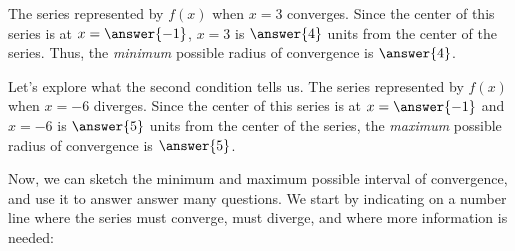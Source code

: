 \documentclass{ximera}
\begin{document}
\begin{exercise}
\begin{hint}
\begin{question}
\begin{question}
The series represented by $f(x)$ when $x=3$ converges.  Since the center of this series is at $x=\answer{-1}$, $x=3$ is $\answer{4}$ units from the center of the series.  Thus, the \emph{minimum} possible radius of convergence is $\answer{4}$.
\end{question}
\end{question}


\begin{question}
Let's explore what the second condition tells us.  The series represented by $f(x)$ when $x=-6$ diverges.  Since the center of this series is at $x=\answer{-1}$ and $x=-6$ is $\answer{5}$ units from the center of the series, the \emph{maximum} possible radius of convergence is $\answer{5}$.
\end{question}

\begin{question}
Now, we can sketch the minimum and maximum possible interval of convergence, and use it to answer answer many questions.  We start by indicating on a number line where the series must converge, must diverge, and where more information is needed:

\begin{image}
\end{image}
\end{question}
\end{hint}
\end{exercise}
\end{document}

